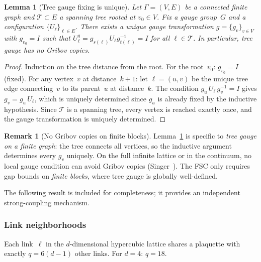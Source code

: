 \documentclass[11pt]{article}
\newtheorem{lemma}[theorem]{Lemma}
\theoremstyle{definition}
\newtheorem{remark}[theorem]{Remark}
\begin{document}
\begin{lemma}[Tree gauge fixing is unique]
\label{syn-lem:tree_gauge}
Let $\Gamma = (V, E)$ be a connected finite graph and
$\mathcal{T} \subset E$ a spanning tree rooted at
$v_0 \in V$.  Fix a gauge group~$G$ and a
configuration $\{U_\ell\}_{\ell \in E}$.
There exists a \emph{unique} gauge transformation
$g = \{g_v\}_{v \in V}$ with $g_{v_0} = I$ such that
$U_\ell^g = g_{s(\ell)} U_\ell g_{t(\ell)}^{-1} = I$
for all $\ell \in \mathcal{T}$.
In particular, tree gauge has no Gribov copies.
\end{lemma}

\begin{proof}
Induction on the tree distance from the root.
For the root~$v_0$: $g_{v_0} = I$ (fixed).
For any vertex~$v$ at distance~$k+1$: let $\ell = (u, v)$
be the unique tree edge connecting~$v$ to its parent~$u$
at distance~$k$.  The condition
$g_u\,U_\ell\,g_v^{-1} = I$ gives
$g_v = g_u\,U_\ell$, which is uniquely
determined since $g_u$ is already fixed by the
inductive hypothesis.  Since $\mathcal{T}$ is a spanning
tree, every vertex is reached exactly once, and the
gauge transformation is uniquely determined.
\end{proof}

\begin{remark}[No Gribov copies on finite blocks]
\label{syn-rem:gribov}
Lemma~\ref{syn-lem:tree_gauge} is specific to
\emph{tree gauge on a finite graph}: the tree connects
all vertices, so the inductive argument determines every
$g_v$ uniquely.  On the full infinite lattice or in the
continuum, no local gauge condition can avoid Gribov
copies (Singer~\cite{Singer78}).  The FSC only requires
gap bounds on \emph{finite blocks}, where tree gauge is
globally well-defined.
\end{remark}




The following result is included for completeness; it provides
an independent strong-coupling mechanism.

\subsubsection{Link neighborhoods}

Each link~$\ell$ in the $d$-dimensional hypercubic lattice
shares a plaquette with exactly $q = 6(d{-}1)$ other links.
For $d = 4$: $q = 18$.
\end{document}
